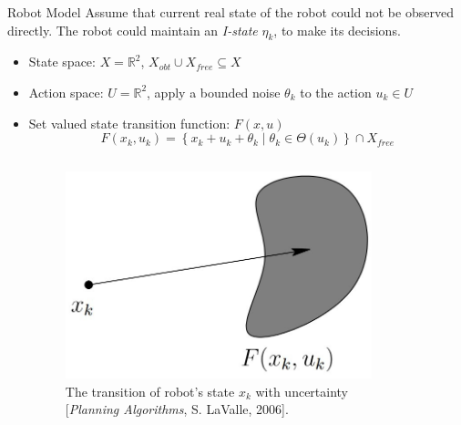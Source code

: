 \documentclass[10pt]{beamer}
\begin{document}
\begin{frame}{Robot Model}
Assume that current real state of the robot could not be observed directly.  The
robot could maintain an \emph{I-state} $\eta_k$, to make its decisions.
\begin{itemize}
\item State space: $X = \mathbb{R}^2$,  $X_{obt} \cup X_{free} \subseteq X$
\item Action space: $U = \mathbb{R}^2$, apply a bounded noise $\theta_k$ to the
  action $u_k \in U$
\item Set valued state transition function: $F(x, u)$
  \begin{equation}
    \label{eq:state-trans}
    F(x_k, u_k) = \left\{
      x_k + u_k + \theta_k
      \mid
      \theta_k \in \Theta(u_k)
    \right\} \cap X_{free}
  \end{equation}
  \begin{columns}
    \begin{column}{0.4\textwidth}
      \begin{figure}
        \centering
        \includegraphics[scale=0.2]{figs/istate.jpg}
        \caption{\scriptsize{The transition of robot's state $x_k$ with
            uncertainty [\emph{Planning Algorithms}, S. LaValle, 2006].}}
      \end{figure}
    \end{column}
    \begin{column}{0.5\textwidth}
      \begin{figure}
        \centering

\end{figure}
\end{column}
\end{columns}
\end{itemize}
\end{frame}
\end{document}
